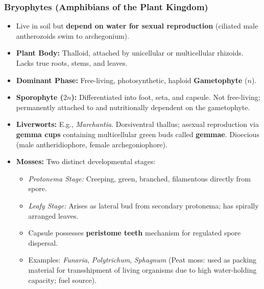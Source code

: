 \documentclass[11pt,a4paper]{article}
\begin{document}
\subsubsection{Bryophytes (Amphibians of the Plant Kingdom)}
\begin{itemize}[leftmargin=1.5em, itemsep=2pt]
  \item Live in soil but \textbf{depend on water for sexual reproduction} (ciliated male antherozoids swim to archegonium).
  \item \textbf{Plant Body:} Thalloid, attached by unicellular or multicellular rhizoids. Lacks true roots, stems, and leaves.
  \item \textbf{Dominant Phase:} Free-living, photosynthetic, haploid \textbf{Gametophyte} ($n$).
  \item \textbf{Sporophyte ($2n$):} Differentiated into foot, seta, and capsule. Not free-living; permanently attached to and nutritionally dependent on the gametophyte.
  \item \textbf{Liverworts:} E.g., \textit{Marchantia}. Dorsiventral thallus; asexual reproduction via \textbf{gemma cups} containing multicellular green buds called \textbf{gemmae}. Dioecious (male antheridiophore, female archegoniophore).
  \item \textbf{Mosses:} Two distinct developmental stages:
  \begin{itemize}[label=$\circ$]
    \item \textit{Protonema Stage:} Creeping, green, branched, filamentous directly from spore.
    \item \textit{Leafy Stage:} Arises as lateral bud from secondary protonema; has spirally arranged leaves.
    \item Capsule possesses \textbf{peristome teeth} mechanism for regulated spore dispersal.
    \item Examples: \textit{Funaria}, \textit{Polytrichum}, \textit{Sphagnum} (Peat moss: used as packing material for transshipment of living organisms due to high water-holding capacity; fuel source).
  \end{itemize}
\end{itemize}
\end{document}
